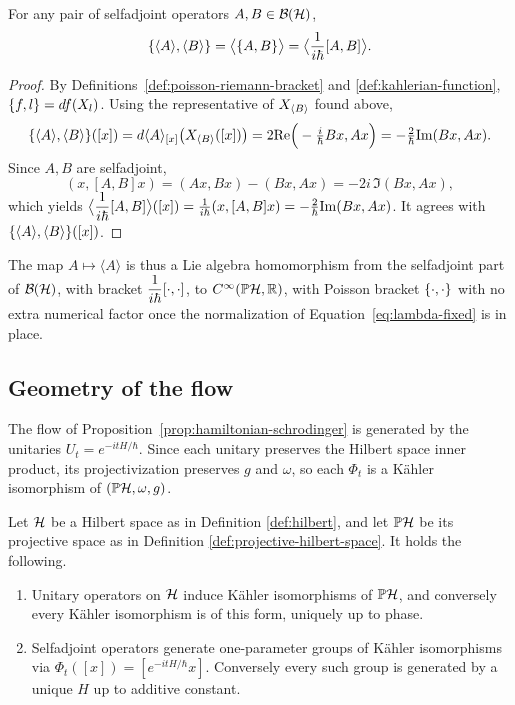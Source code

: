 \begin{proposition}
	\label{prop:poisson-comm}
	For any pair of selfadjoint operators $A,B\in\BH$,
	\[
	\{\langle A\rangle,\langle B\rangle\}= \big\langle \{A,B \} \big\rangle= \big\langle\dfrac{1}{i\hbar}[A,B]\big\rangle.
	\]
\end{proposition}

\begin{proof}
	By Definitions~\ref{def:poisson-riemann-bracket} and \ref{def:kahlerian-function}, $\{f,l\}=df(X_{l})$. Using the representative of $X_{\langle B\rangle}$ found above,
	\[
	\{\langle A\rangle,\langle B\rangle\}([x])=d\langle A\rangle_{[x]}\big(X_{\langle B\rangle}([x])\big)=2\mathrm{Re}\Big(-\tfrac{i}{\hbar}Bx,Ax\Big)=-\tfrac{2}{\hbar}\mathrm{Im}(Bx,Ax).
	\]
	Since $A,B$ are selfadjoint,
	\[
	(x,[A,B]x)=(Ax,Bx)-(Bx,Ax)=-2i\,\Im(Bx,Ax),
	\]
	which yields $\big\langle\dfrac{1}{i\hbar}[A,B]\big\rangle([x])=\frac{1}{i\hbar}(x,[A,B]x)=-\frac{2}{\hbar}\mathrm{Im}(Bx,Ax)$. It  agrees with $\{\langle A\rangle,\langle B\rangle\}([x])$.
\end{proof}

\begin{remark}
	The map $A\mapsto\langle A\rangle$ is thus a Lie algebra homomorphism
	from the selfadjoint part of $\BH$, with bracket $\dfrac{1}{i\hbar}[\cdot,\cdot]$,
	to $C^\infty(\PH,\R)$, with Poisson bracket $\{\cdot,\cdot\}$ with no
	extra numerical factor once the normalization of Equation~\eqref{eq:lambda-fixed}
	is in place.
\end{remark}

\subsection*{Geometry of the flow}

The flow of Proposition~\ref{prop:hamiltonian-schrodinger} is generated
by the unitaries $U_t=e^{-itH/\hbar}$. Since each unitary preserves the
Hilbert space inner product, its projectivization preserves $g$ and
$\omega$, so each $\Phi_t$ is a Kähler isomorphism of $(\PH,\omega,g)$.

\begin{proposition}
	\label{prop:kahler-isomorphisms}
	Let $\H$ be a Hilbert space as in Definition \ref{def:hilbert}, and let $\PH$ be its projective space as in Definition \ref{def:projective-hilbert-space}. It holds the following.
	\begin{enumerate}
		\item Unitary operators on $\H$ induce Kähler isomorphisms of $\PH$, and conversely every Kähler isomorphism is of this form, uniquely up to phase.
		\item Selfadjoint operators generate one-parameter groups of Kähler isomorphisms via $\Phi_t([x])=[e^{-itH/\hbar}x]$. Conversely every such group is generated by a unique $H$ up to additive constant.
	\end{enumerate}
\end{proposition}

